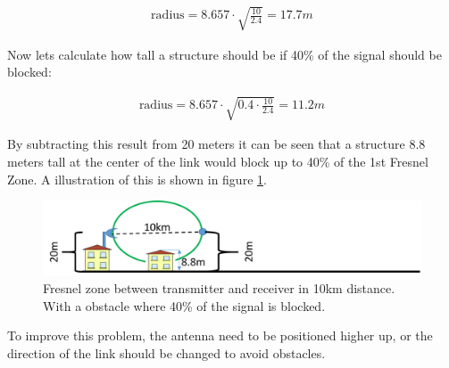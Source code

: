 \begin{align*}
\text{radius} = 8.657\cdot \sqrt{\frac{10}{2.4}} = 17.7m
\end{align*}

Now lets calculate how tall a structure should be if 40\% of the signal should be blocked:

\begin{align*}
\text{radius} = 8.657\cdot \sqrt{0.4\cdot \frac{10}{2.4}} = 11.2m
\end{align*}
  
By subtracting this result from 20 meters it can be seen that a structure 8.8 meters tall at the center of the link would block up to 40\% of the 1st Fresnel Zone. A illustration of this is shown in figure \ref{fig:fresnel_zones_10km_60procent}.

\begin{figure}[H]
	\centering
	\includegraphics[scale=0.50]{figures/fresnel_10km_60procent.png}
	\caption{Fresnel zone between transmitter and receiver in 10km distance. With a obstacle where 40\% of the signal is blocked.}
	\label{fig:fresnel_zones_10km_60procent}
\end{figure}  

To improve this problem, the antenna need to be positioned higher up, or the direction of the link should be changed to avoid obstacles.

